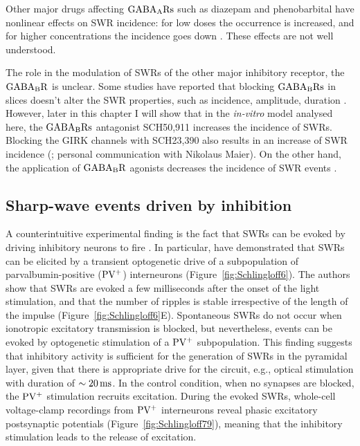     Other major drugs affecting $\rm GABA_A Rs$ such as diazepam and
    phenobarbital have nonlinear effects on SWR incidence: for low doses
    the occurrence is increased, and for higher concentrations the incidence
    goes down \citep{Papatheodoropoulos2007, Koniaris2011}. These effects are
    not well understood.
  
    The role in the modulation of SWRs of the other major inhibitory receptor,
    the $\rm GABA_B R$ is unclear. Some studies have reported that blocking
    $\rm GABA_B Rs$ in slices doesn't alter the SWR properties, such as
    incidence, amplitude, duration \citep{Hollnagel2014, Hofer2015}. However,
    later in this chapter I will show that in the \textit{in-vitro} model
    analysed here, the $\rm GABA_B Rs$ antagonist SCH50,911 increases the
    incidence of SWRs. Blocking the GIRK channels with SCH23,390 also results
    in an increase of SWR incidence (\citealp{Maier2012}; personal communication
    with Nikolaus Maier). On the other hand, the application of $\rm GABA_B R$
    agonists decreases the incidence of SWR events \citep{Maier2012,
    Hollnagel2014}.


  \subsection{Sharp-wave events driven by inhibition}
    A counterintuitive experimental finding is the fact that SWRs can be evoked
    by driving inhibitory neurons to fire \citep{Ellender2010, Schlingloff2014,
    Kohus2016}. In particular, \cite{Schlingloff2014} have demonstrated that
    SWRs can be elicited by a transient optogenetic drive of a subpopulation of
    parvalbumin-positive ($\rm PV^+$) interneurons
    (Figure~\ref{fig:Schlingloff6}). The authors show that SWRs are evoked a
    few milliseconds after the onset of the light stimulation, and that the
    number of ripples is stable irrespective of the length of the impulse
    (Figure~\ref{fig:Schlingloff6}E). Spontaneous SWRs do not occur when
    ionotropic excitatory transmission is blocked, but nevertheless, events can
    be evoked by optogenetic stimulation of a $\rm PV^+$ subpopulation. This
    finding suggests that inhibitory activity is sufficient for the generation
    of SWRs in the pyramidal layer, given that there is appropriate drive for
    the circuit, e.g., optical stimulation with duration of $\sim 20 \, \rm
    ms$. In the control condition, when no synapses are blocked, the $\rm PV^+$
    stimulation recruits excitation. During the evoked SWRs, whole-cell
    voltage-clamp recordings from $\rm PV^+$ interneurons reveal phasic
    excitatory postsynaptic potentials (Figure~\ref{fig:Schlingloff79}),
    meaning that the inhibitory stimulation leads to the release of excitation.

